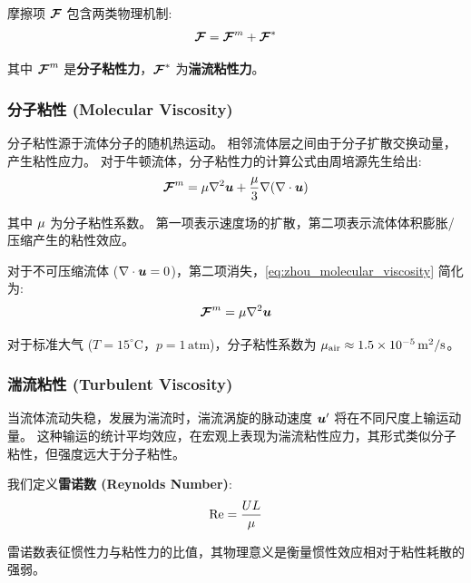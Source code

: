 \vspace{1em}
摩擦项 $\bm{\mathcal{F}}$ 包含两类物理机制:
\begin{equation}
    \bm{\mathcal{F}} = \bm{\mathcal{F}}^{m} + \bm{\mathcal{F}}^{\ast}
    \label{eq:dissipation_decomposition}
\end{equation}

其中 $\bm{\mathcal{F}}^{m}$ 是\textbf{分子粘性力}，$\bm{\mathcal{F}}^{\ast}$ 为\textbf{湍流粘性力}。

\subsubsection{分子粘性 (Molecular Viscosity)}

分子粘性源于流体分子的随机热运动。
相邻流体层之间由于分子扩散交换动量，产生粘性应力。
对于牛顿流体，分子粘性力的计算公式由周培源先生给出:
\begin{equation}
    \bm{\mathcal{F}}^{m} = \mu \nabla^2 \bm{u} + \frac{\mu}{3} \nabla (\nabla \cdot \bm{u})
    \label{eq:zhou_molecular_viscosity}
\end{equation}

其中 $\mu$ 为分子粘性系数。
第一项表示速度场的扩散，第二项表示流体体积膨胀/压缩产生的粘性效应。

对于不可压缩流体 ($\nabla \cdot \bm{u} = 0$)，第二项消失，\eqref{eq:zhou_molecular_viscosity} 简化为:
\begin{equation}
    \bm{\mathcal{F}}^{m} = \mu \nabla^2 \bm{u}
    \label{eq:molecular_friction}
\end{equation}

对于标准大气 ($T=15^\circ\mathrm{C}$，$p=1\,\mathrm{atm}$)，分子粘性系数为 $\mu_{\text{air}} \approx 1.5 \times 10^{-5}\,\mathrm{m^2/s}$。

\subsubsection{湍流粘性 (Turbulent Viscosity)}

当流体流动失稳，发展为湍流时，湍流涡旋的脉动速度 $\bm{u}'$ 将在不同尺度上输运动量。
这种输运的统计平均效应，在宏观上表现为湍流粘性应力，其形式类似分子粘性，但强度远大于分子粘性。

我们定义\textbf{雷诺数 (Reynolds Number)}:
\begin{equation}
    \text{Re} = \frac{U L}{\mu}
    \label{eq:reynolds_number}
\end{equation}

雷诺数表征惯性力与粘性力的比值，其物理意义是衡量惯性效应相对于粘性耗散的强弱。

